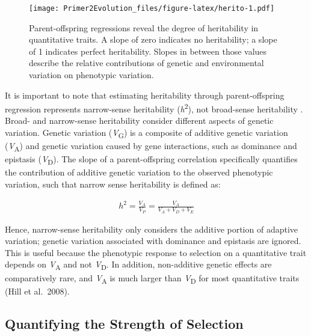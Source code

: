 \documentclass[
]{book}
\begin{document}
\begin{figure}
\centering
\texttt{[image: Primer2Evolution\_files/figure-latex/herito-1.pdf]}
\caption{\label{fig:herito}Parent-offspring regressions reveal the degree of heritability in quantitative traits. A slope of zero indicates no heritability; a slope of 1 indicates perfect heritability. Slopes in between those values describe the relative contributions of genetic and environmental variation on phenotypic variation.}
\end{figure}

It is important to note that estimating heritability through parent-offspring regression represents narrow-sense heritability (\emph{h}\textsuperscript{2}), not broad-sense heritability . Broad- and narrow-sense heritability consider different aspects of genetic variation. Genetic variation (\emph{V}\textsubscript{G}) is a composite of additive genetic variation (\emph{V}\textsubscript{A}) and genetic variation caused by gene interactions, such as dominance and epistasis (\emph{V}\textsubscript{D}). The slope of a parent-offspring correlation specifically quantifies the contribution of additive genetic variation to the observed phenotypic variation, such that narrow sense heritability is defined as:

\begin{align} 
h^2 = \frac{V_A}{V_P}=\frac{V_A}{V_A+V_D+V_E} \label{eq:40}
\end{align}

Hence, narrow-sense heritability only considers the additive portion of adaptive variation; genetic variation associated with dominance and epistasis are ignored. This is useful because the phenotypic response to selection on a quantitative trait depends on \emph{V}\textsubscript{A} and not \emph{V}\textsubscript{D}. In addition, non-additive genetic effects are comparatively rare, and \emph{V}\textsubscript{A} is much larger than \emph{V}\textsubscript{D} for most quantitative traits (Hill et al.~2008).

\hypertarget{quantifying-the-strength-of-selection}{%
\subsection{Quantifying the Strength of Selection}\label{quantifying-the-strength-of-selection}}
\end{document}
